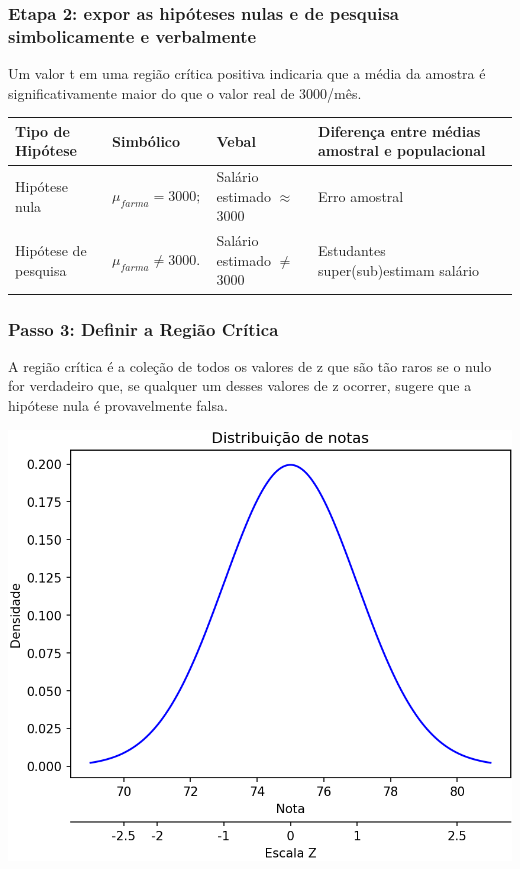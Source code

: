 \documentclass[11pt]{beamer}
\begin{document}
\begin{frame}
\frametitle{Etapa 2: expor as hipóteses nulas e de pesquisa simbolicamente e verbalmente}

Um valor t em uma região crítica positiva indicaria que a média da amostra é significativamente maior do que o valor real de 3000/mês.

\begin{center}
\begin{tabular}{ m{2cm}|m{2cm}|m{3cm}|m{3cm} } 
 \hline
 Tipo de Hipótese & Simbólico & Vebal & Diferença entre médias amostral e populacional\\
  \hline
 Hipótese nula & $\mu_{farma}=3000;$ & Salário estimado $\approx$ 3000 & Erro amostral \\ 
 Hipótese de pesquisa & $\mu_{farma} \neq 3000.$ & Salário estimado $\neq$ 3000 & Estudantes super(sub)estimam salário  \\ 
 \hline
 \hline
\end{tabular}
\end{center}

\end{frame}

\begin{frame}
\frametitle{Passo 3: Definir a Região Crítica}
A região crítica é a coleção de todos os valores de z que são tão raros se o nulo for verdadeiro que, se qualquer um desses valores de z ocorrer, sugere que a hipótese nula é provavelmente falsa.
\begin{center}\includegraphics[width=0.6\linewidth]{figs/two_xticks_under} \end{center}

\end{frame}
\end{document}
